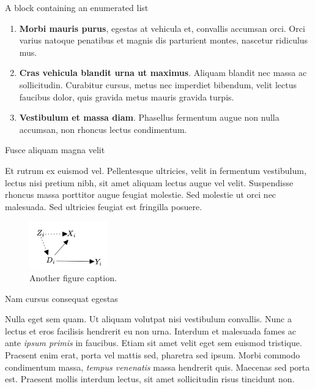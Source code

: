 \documentclass[final]{beamer}
\newlength{\colwidth}
\begin{document}
\begin{frame}[t]
\begin{columns}[t]
\begin{column}{\colwidth}
\begin{block}{A block containing an enumerated list}
        \begin{enumerate}
          \item \textbf{Morbi mauris purus}, egestas at vehicula et, convallis
                accumsan orci. Orci varius natoque penatibus et magnis dis parturient
                montes, nascetur ridiculus mus.
          \item \textbf{Cras vehicula blandit urna ut maximus}. Aliquam blandit nec
                massa ac sollicitudin. Curabitur cursus, metus nec imperdiet bibendum,
                velit lectus faucibus dolor, quis gravida metus mauris gravida turpis.
          \item \textbf{Vestibulum et massa diam}. Phasellus fermentum augue non
                nulla accumsan, non rhoncus lectus condimentum.
        \end{enumerate}

      \end{block}

      \begin{block}{Fusce aliquam magna velit}

        Et rutrum ex euismod vel. Pellentesque ultricies, velit in fermentum
        vestibulum, lectus nisi pretium nibh, sit amet aliquam lectus augue vel
        velit. Suspendisse rhoncus massa porttitor augue feugiat molestie. Sed
        molestie ut orci nec malesuada. Sed ultricies feugiat est fringilla
        posuere.

        \begin{figure}
          \centering
          \includegraphics[width=0.3\textwidth]{figures/dag.png}

          \caption{Another figure caption.}
        \end{figure}

      \end{block}

      \begin{block}{Nam cursus consequat egestas}

        Nulla eget sem quam. Ut aliquam volutpat nisi vestibulum convallis. Nunc a
        lectus et eros facilisis hendrerit eu non urna. Interdum et malesuada fames
        ac ante \textit{ipsum primis} in faucibus. Etiam sit amet velit eget sem
        euismod tristique. Praesent enim erat, porta vel mattis sed, pharetra sed
        ipsum. Morbi commodo condimentum massa, \textit{tempus venenatis} massa
        hendrerit quis. Maecenas sed porta est. Praesent mollis interdum lectus,
        sit amet sollicitudin risus tincidunt non.


\end{block}
\end{column}
\end{columns}
\end{frame}
\end{document}
